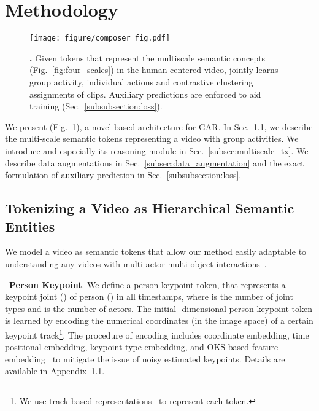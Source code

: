 \documentclass[runningheads]{llncs}
\begin{document}
 

\section{Methodology}
\label{sec:method}

\begin{figure}[t]
\centering
	\texttt{[image: figure/composer\_fig.pdf]}
    \caption{\textbf{\ourseos.}
	Given tokens that represent the
	multiscale
	semantic concepts (Fig.~\ref{fig:four_scales})
	in the
	human-centered 
	video,
	\ours jointly learns group activity, individual actions and contrastive clustering assignments of clips. Auxiliary predictions are enforced to aid training (Sec.~\ref{subsubsection:loss}).
}
\label{fig:composer}
\end{figure} 



 


We present  
\ours (Fig.~\ref{fig:composer}), a novel \mtx based architecture for GAR.
In Sec.~\ref{subsec:entity_repre},
we describe the multi-scale semantic tokens representing a video with group activities.
We introduce \ours
and especially its reasoning module \mtx in Sec.~\ref{subsec:multiscale_tx}.
We describe data augmentations in Sec.~\ref{subsec:data_augmentation} and the exact formulation of auxiliary prediction in Sec.~\ref{subsubsection:loss}.


 
\subsection{Tokenizing a Video as Hierarchical Semantic Entities}
\label{subsec:entity_repre}

We model a video as semantic tokens 
that allow our method easily adaptable to understanding any videos with multi-actor multi-object interactions~\cite{luo2021moma}.


\noindent \textbullet\ \textbf{Person Keypoint}. 
We define a person keypoint token,  that represents a keypoint joint   () of person  ()  in all timestamps,
where  is the number of joint
types and  is the number of actors.
The initial -dimensional person keypoint token is learned by encoding the numerical coordinates (in the image space) of a certain keypoint track\footnote{We use track-based representations~\cite{POGARS,zappardino2021learning,actor-transformer,GroupFormer} to represent each token.}. 
The procedure of encoding includes coordinate embedding, time positional embedding, keypoint type embedding, and OKS-based feature embedding~\cite{snower202015} to mitigate the issue of noisy estimated keypoints. 
Details
are available in Appendix~\ref{subsec:entity_repre}.
 
\end{document}
